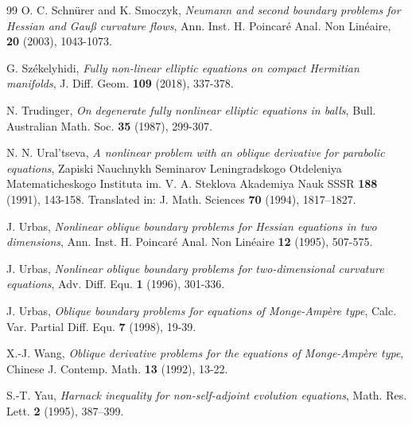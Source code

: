 \documentclass[12pt]{amsart}
\theoremstyle{definition}
\theoremstyle{remark}
\numberwithin{equation}{section}
\begin{document}
\begin{thebibliography}{99}
	O. C. Schnürer and K. Smoczyk,
	{\em Neumann and second boundary problems for Hessian and Gauß curvature flows},
	{Ann. Inst. H. Poincar\'e Anal. Non Lin\'eaire}, {\bf 20} (2003), 1043-1073.
	
	G. Sz\'ekelyhidi, 
	{\em Fully non-linear elliptic equations on compact Hermitian manifolds}, 
	{J. Diff. Geom.} {\bf 109} (2018), 337-378.
	
	N. Trudinger,
	{\em On degenerate fully nonlinear elliptic equations in balls},
	{Bull. Australian Math. Soc.} {\bf 35} (1987), 299-307.
	
	N. N. Ural'tseva,
	{\em A nonlinear problem with an oblique derivative for parabolic equations},
	{ Zapiski Nauchnykh Seminarov Leningradskogo Otdeleniya Matematicheskogo Instituta im. V. A. Steklova Akademiya Nauk SSSR} {\bf 188} (1991), 143-158. Translated in: {J. Math. Sciences} {\bf 70} (1994), 1817–1827.
	
	J. Urbas, 
	{\em Nonlinear oblique boundary problems for Hessian equations in two dimensions},
	{Ann. Inst. H. Poincar\'e Anal. Non Lin\'eaire}  {\bf 12} (1995), 507-575.
	
	J. Urbas, 
	{\em Nonlinear oblique boundary problems for two-dimensional curvature equations},
	{Adv. Diff. Equ.}  {\bf 1} (1996), 301-336.
	
	J. Urbas, 
	{\em Oblique boundary problems for equations of Monge-Amp\`ere type},
	{Calc. Var. Partial Diff. Equ.}  {\bf 7} (1998), 19-39.
	
	X.-J. Wang,
	{\em Oblique derivative problems for the equations of Monge-Amp\`ere type},
	{Chinese J. Contemp. Math.} {\bf 13} (1992), 13-22.
	
	S.-T. Yau, 
	{\em Harnack inequality for non-self-adjoint evolution equations},
	{Math. Res. Lett.}  {\bf 2} (1995), 387–399.
	
	
\end{thebibliography}

	
\end{document}
